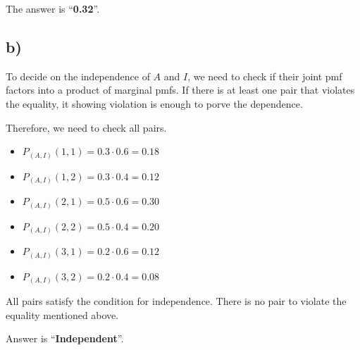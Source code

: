 \documentclass[12pt]{article}
\newcommand{\probb}[2]{P_{(#1)}(#2)}
\begin{document}
\noindent The answer is ``\textbf{0.32}''.

\subsection*{b)}

To decide on the independence of $A$ and $I$, we need to check if their joint pmf factors into a product of marginal pmfs. If there is at least one pair that violates the equality, it showing violation is enough to porve the dependence.

Therefore, we need to check all pairs.
\begin{multicols}{2}
    \begin{itemize}
        \item $\probb{A,I}{1, 1} = 0.3 \cdot 0.6 = 0.18$
        \item $\probb{A,I}{1, 2} = 0.3 \cdot 0.4 = 0.12$
        \item $\probb{A,I}{2, 1} = 0.5 \cdot 0.6 = 0.30$
        \item $\probb{A,I}{2, 2} = 0.5 \cdot 0.4 = 0.20$
        \item $\probb{A,I}{3, 1} = 0.2 \cdot 0.6 = 0.12$
        \item $\probb{A,I}{3, 2} = 0.2 \cdot 0.4 = 0.08$
    \end{itemize}    
\end{multicols}

\noindent All pairs satisfy the condition for independence. There is no pair to violate the equality mentioned above.

Answer is ``\textbf{Independent}''.
\end{document}
